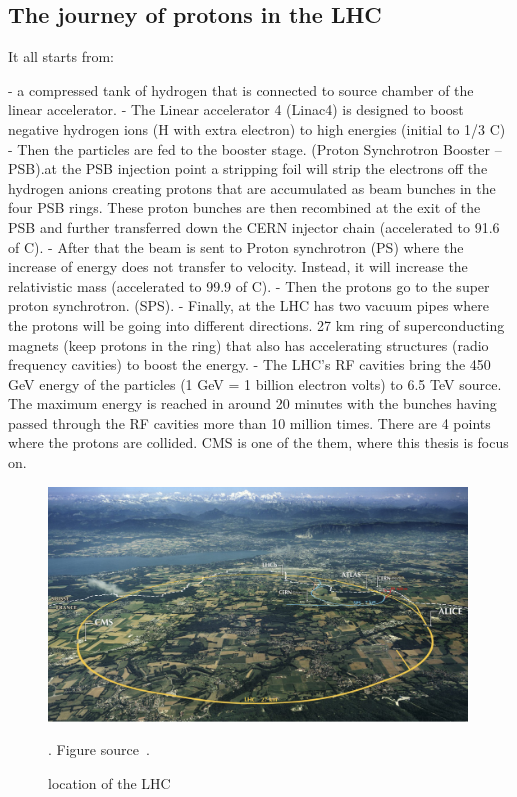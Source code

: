 \subsection{The journey of protons in the LHC}

It all starts from:  

- a compressed tank of hydrogen that is connected to source chamber of the linear accelerator. 
- The Linear accelerator 4 (Linac4) is designed to boost negative hydrogen ions (H with extra electron) to high energies (initial to 1/3 C)
- Then the particles are fed to the booster stage. (Proton Synchrotron Booster – PSB).at the PSB injection point a stripping foil will strip the electrons off the hydrogen anions creating protons that are accumulated as beam bunches in the four PSB rings. 
These proton bunches are then recombined at the exit of the PSB and further transferred down the CERN injector chain (accelerated to 91.6 of C).
- After that the beam is sent to Proton synchrotron (PS) where the increase of energy does not transfer to velocity. Instead, it will increase the relativistic mass (accelerated to 99.9 of C).
- Then the protons go to the super proton synchrotron. (SPS).
- Finally, at the LHC has two vacuum pipes where the protons will be going into different directions. 27 km ring of superconducting magnets (keep protons in the ring) that also has accelerating structures (radio frequency cavities) to boost the energy.  
- The LHC’s RF cavities bring the 450 GeV energy of the particles (1 GeV = 1 billion electron volts) to 6.5 TeV source. The maximum energy is reached in around 20 minutes with the bunches having passed through the RF cavities more than 10 million times. There are 4 points where the protons are collided. CMS is one of the them, where this thesis is focus on. 



\begin{figure}[t!]
\centering
\includegraphics[width=0.99\textwidth]{figures/LHC_location.png}
\caption[location of the LHC]{location of the LHC}. Figure source~\cite{SMtable}.
\label{fig:LHC_location}
\end{figure}

